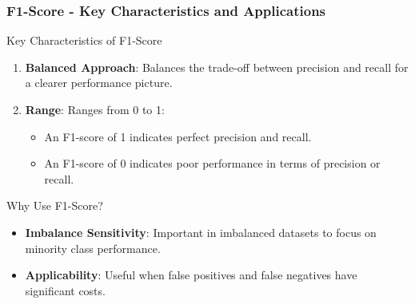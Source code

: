 \documentclass[aspectratio=169]{beamer}
\begin{document}
\begin{frame}[fragile]
    \frametitle{F1-Score - Key Characteristics and Applications}

    \begin{block}{Key Characteristics of F1-Score}
        \begin{enumerate}
            \item \textbf{Balanced Approach}: Balances the trade-off between precision and recall for a clearer performance picture.
            \item \textbf{Range}: Ranges from 0 to 1:
            \begin{itemize}
                \item An F1-score of 1 indicates perfect precision and recall.
                \item An F1-score of 0 indicates poor performance in terms of precision or recall.
            \end{itemize}
        \end{enumerate}
    \end{block}
    
    \begin{block}{Why Use F1-Score?}
        \begin{itemize}
            \item \textbf{Imbalance Sensitivity}: Important in imbalanced datasets to focus on minority class performance.
            \item \textbf{Applicability}: Useful when false positives and false negatives have significant costs.
        \end{itemize}
    \end{block}
\end{frame}
\end{document}
